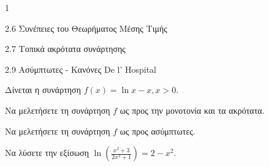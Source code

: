 \begin{ylh}{1}
    \item 2.6 Συνέπειες του Θεωρήματος Μέσης Τιμής
    \item 2.7 Τοπικά ακρότατα συνάρτησης
    \item 2.9 Ασύμπτωτες - Κανόνες De l’ Hospital
\end{ylh}
Δίνεται η συνάρτηση $f(x) = \ln x - x, x > 0$.
\begin{alist}
\item Να μελετήσετε τη συνάρτηση $f$ ως προς την μονοτονία και τα ακρότατα. 
\item Να μελετήσετε τη συνάρτηση $f$ ως προς ασύμπτωτες. 
\item Να λύσετε την εξίσωση $\ln\left(\frac{x^2+3}{2x^2+1}\right) = 2 - x^2$. 
\end{alist}